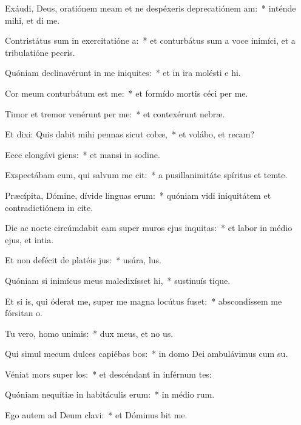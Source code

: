 \item Exáudi, Deus, oratiónem meam et ne despéxeris deprecatiónem am:~* inténde mihi, et di me.
\item Contristátus sum in exercitatióne a:~* et conturbátus sum a voce inimíci, et a tribulatióne pecris.
\item Quóniam declinavérunt in me iniquites:~* et in ira molésti e hi.
\item Cor meum conturbátum est  me:~* et formído mortis céci per me.
\item Timor et tremor venérunt per me:~* et contexérunt  nebræ.
\item Et dixi: Quis dabit mihi pennas sicut cobæ,~* et volábo, et recam?
\item Ecce elongávi giens:~* et mansi in sodine.
\item Exspectábam eum, qui salvum me cit:~* a pusillanimitáte spíritus et temte.
\item Præcípita, Dómine, dívide linguas erum:~* quóniam vidi iniquitátem et contradictiónem in cite.
\item Die ac nocte circúmdabit eam super muros ejus inquitas:~* et labor in médio ejus, et intia.
\item Et non defécit de platéis jus:~* usúra,  lus.
\item Quóniam si inimícus meus maledixísset hi,~* sustinuís tique.
\item Et si is, qui óderat me, super me magna locútus fuset:~* abscondíssem me fórsitan  o.
\item Tu vero, homo unimis:~* dux meus, et no us.
\item Qui simul mecum dulces capiébas bos:~* in domo Dei ambulávimus cum su.
\item Véniat mors super los:~* et descéndant in inférnum tes:
\item Quóniam nequítiæ in habitáculis erum:~* in médio rum.
\item Ego autem ad Deum clavi:~* et Dóminus bit me.
